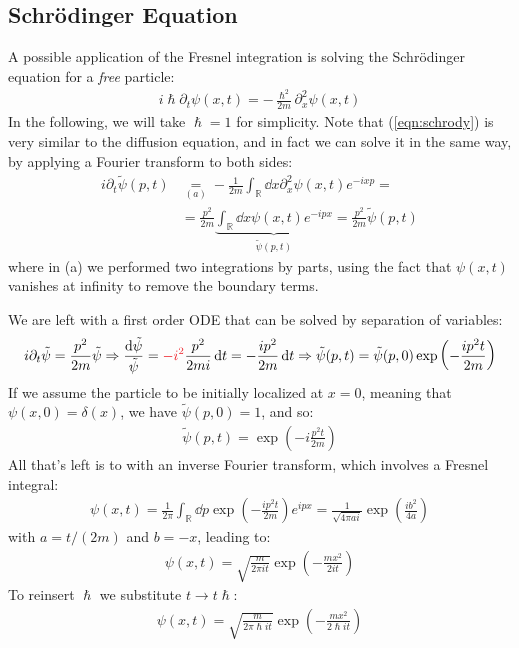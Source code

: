 \documentclass[../template.tex]{subfiles}
\begin{document}
\subsection{Schr\"odinger Equation}
A possible application of the Fresnel integration is solving the Schr\"odinger equation for a \textit{free} particle:
\begin{align} \label{eqn:schrody}
    i \hslash \partial_t \psi(x,t) = -\frac{\hslash^2}{2m} \partial_x^2 \psi(x,t)   
\end{align} 
In the following, we will take $\hslash = 1$ for simplicity. Note that (\ref{eqn:schrody}) is very similar to the diffusion equation, and in fact we can solve it in the same way, by applying a Fourier transform to both sides:
\begin{align*}
    i \partial_t \tilde{\psi}(p,t) &\underset{(a)}{=}  -\frac{1}{2m} \int_{\mathbb{R}} \dd{x} \partial_x^2 \psi(x,t) e^{-ixp} =\\ 
    &= \frac{p^2}{2m} \underbrace{\int_{\mathbb{R}} \dd{x} \psi(x,t) e^{-ipx}}_{\tilde{\psi}(p,t)}  = \frac{p^2}{2m} \tilde{\psi}(p,t) 
\end{align*}
where in (a) we performed two integrations by parts, using the fact that $\psi(x,t)$ vanishes at infinity to remove the boundary terms. 

\medskip

We are left with a first order ODE that can be solved by separation of variables:
\begin{align*}
    i \partial_t \tilde{\psi} = \frac{p^2}{2m} \tilde{\psi} \Rightarrow \frac{\dd{\tilde{\psi}}}{\tilde{\psi}} = \textcolor{Red}{-i^2} \frac{p^2}{2m i} \dd{t} = -\frac{ip^2}{2m} \dd{t} \Rightarrow \tilde{\psi}(p,t) = \tilde{\psi}(p,0) \exp\left(-\frac{ip^2 t}{2m} \right)
\end{align*}
If we assume the particle to be initially localized at $x=0$, meaning that $\psi(x,0) = \delta(x)$, we have $\tilde{\psi}(p,0) = 1$, and so:
\begin{align*}
    \tilde{\psi}(p,t) = \exp\left(-i\frac{p^2 t}{2m} \right)
\end{align*}
All that's left is to  with an inverse Fourier transform, which involves a Fresnel integral:
\begin{align*}
    \psi(x,t) = \frac{1}{2\pi} \int_{\mathbb{R}} \dd{p} \exp\left(-\frac{ip^2 t}{2m} \right) e^{ipx} = \frac{1}{\sqrt{4 \pi a i}} \exp\left(\frac{ib^2}{4a} \right) 
\end{align*}
with $a = t/(2m)$ and $b=-x$, leading to:
\begin{align*} 
    \psi(x,t) = \sqrt{\frac{m}{2 \pi i t}} \exp\left(-\frac{m x^2}{2 i t} \right)
\end{align*}
To reinsert $\hslash$ we substitute $t \to t \hslash$:
\begin{align*}
    \psi(x,t) = \sqrt{\frac{m}{2 \pi \hslash i t}} \exp\left(-\frac{m x^2}{2 \hslash i t} \right)
\end{align*}
\end{document}
